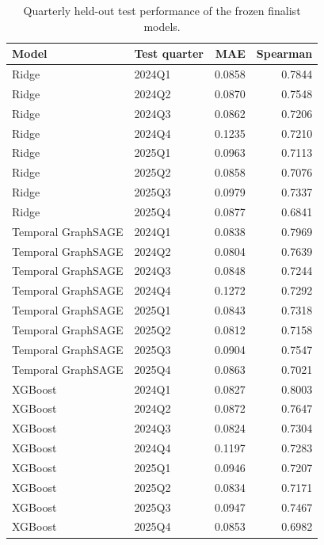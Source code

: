 \begin{table}
\caption{Quarterly held-out test performance of the frozen finalist models.}
\label{tab:final-models-quarterly-test-performance}
\begin{tabular}{llrr}
\toprule
Model & Test quarter & MAE & Spearman \\
\midrule
Ridge & 2024Q1 & 0.0858 & 0.7844 \\
Ridge & 2024Q2 & 0.0870 & 0.7548 \\
Ridge & 2024Q3 & 0.0862 & 0.7206 \\
Ridge & 2024Q4 & 0.1235 & 0.7210 \\
Ridge & 2025Q1 & 0.0963 & 0.7113 \\
Ridge & 2025Q2 & 0.0858 & 0.7076 \\
Ridge & 2025Q3 & 0.0979 & 0.7337 \\
Ridge & 2025Q4 & 0.0877 & 0.6841 \\
Temporal GraphSAGE & 2024Q1 & 0.0838 & 0.7969 \\
Temporal GraphSAGE & 2024Q2 & 0.0804 & 0.7639 \\
Temporal GraphSAGE & 2024Q3 & 0.0848 & 0.7244 \\
Temporal GraphSAGE & 2024Q4 & 0.1272 & 0.7292 \\
Temporal GraphSAGE & 2025Q1 & 0.0843 & 0.7318 \\
Temporal GraphSAGE & 2025Q2 & 0.0812 & 0.7158 \\
Temporal GraphSAGE & 2025Q3 & 0.0904 & 0.7547 \\
Temporal GraphSAGE & 2025Q4 & 0.0863 & 0.7021 \\
XGBoost & 2024Q1 & 0.0827 & 0.8003 \\
XGBoost & 2024Q2 & 0.0872 & 0.7647 \\
XGBoost & 2024Q3 & 0.0824 & 0.7304 \\
XGBoost & 2024Q4 & 0.1197 & 0.7283 \\
XGBoost & 2025Q1 & 0.0946 & 0.7207 \\
XGBoost & 2025Q2 & 0.0834 & 0.7171 \\
XGBoost & 2025Q3 & 0.0947 & 0.7467 \\
XGBoost & 2025Q4 & 0.0853 & 0.6982 \\
\bottomrule
\end{tabular}
\end{table}
